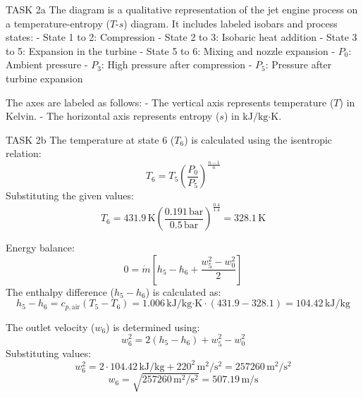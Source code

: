 TASK 2a  
The diagram is a qualitative representation of the jet engine process on a temperature-entropy (\( T \)-\( s \)) diagram. It includes labeled isobars and process states:  
- State 1 to 2: Compression  
- State 2 to 3: Isobaric heat addition  
- State 3 to 5: Expansion in the turbine  
- State 5 to 6: Mixing and nozzle expansion  
- \( P_0 \): Ambient pressure  
- \( P_3 \): High pressure after compression  
- \( P_5 \): Pressure after turbine expansion  

The axes are labeled as follows:  
- The vertical axis represents temperature (\( T \)) in Kelvin.  
- The horizontal axis represents entropy (\( s \)) in \( \text{kJ}/\text{kg·K} \).  

TASK 2b  
The temperature at state 6 (\( T_6 \)) is calculated using the isentropic relation:  
\[
T_6 = T_5 \left( \frac{P_0}{P_5} \right)^{\frac{n-1}{n}}
\]  
Substituting the given values:  
\[
T_6 = 431.9 \, \text{K} \left( \frac{0.191 \, \text{bar}}{0.5 \, \text{bar}} \right)^{\frac{0.4}{1.4}} = 328.1 \, \text{K}
\]  

Energy balance:  
\[
0 = \dot{m} \left[ h_5 - h_6 + \frac{w_5^2 - w_0^2}{2} \right]
\]  
The enthalpy difference (\( h_5 - h_6 \)) is calculated as:  
\[
h_5 - h_6 = c_{p,\text{air}} (T_5 - T_6) = 1.006 \, \text{kJ}/\text{kg·K} \cdot (431.9 - 328.1) = 104.42 \, \text{kJ}/\text{kg}
\]  

The outlet velocity (\( w_6 \)) is determined using:  
\[
w_6^2 = 2(h_5 - h_6) + w_5^2 - w_0^2
\]  
Substituting values:  
\[
w_6^2 = 2 \cdot 104.42 \, \text{kJ}/\text{kg} + 220^2 \, \text{m}^2/\text{s}^2 = 257260 \, \text{m}^2/\text{s}^2
\]  
\[
w_6 = \sqrt{257260 \, \text{m}^2/\text{s}^2} = 507.19 \, \text{m}/\text{s}
\]